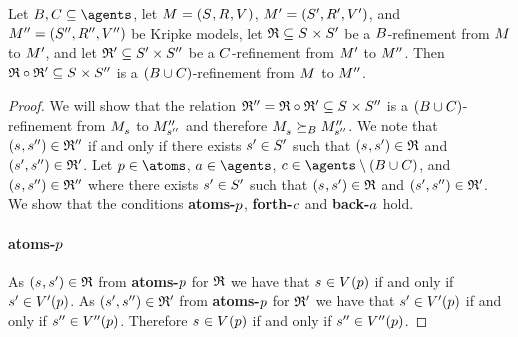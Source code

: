 \begin{proposition}\label{refinement-composition}
Let $\agentsB, \agentsC \subseteq \agents$, let $\kModelAndTuple$, $\kModelAndTupleP$, and $\kModelAndTuplePP$ be Kripke models, let $\refinement \subseteq \kStates \times \kStatesP$ be a $B$-refinement from $\kModel$ to ${M^{\prime}_{}}$, and let $\mathfrak{R}' \subseteq {S^{\prime}} \times {S^{\prime\prime}}$ be a $C$-refinement from ${M^{\prime}_{}}$ to ${M^{\prime\prime}_{}}$.
Then $\refinement \circ \refinement' \subseteq \kStates \times \kStatesPP$ is a $(B \cup C)$-refinement from $\kModel$ to ${M^{\prime\prime}_{}}$.
\end{proposition}

\begin{proof}
    We will show that the relation $\refinement'' = \refinement \circ \refinement' \subseteq \kStates \times \kStatesPP$ is a $(B \cup C)$-refinement from $\kPModel{\kStateS}$ to ${M^{\prime\prime}_{{s}^{\prime\prime}}}$ and therefore $\kPModel{\kStateS} \simulatesBs \kPModelPP{\kStateSPP}$.
We note that $(\kStateS, \kStateSPP) \in \refinement''$ if and only if there exists ${s}^{\prime} \in {S^{\prime}}$ such that $(\kStateS, \kStateSP) \in \refinement$ and $({s}^{\prime}, {s}^{\prime\prime}) \in \mathfrak{R}'$.
Let $\atomP \in \atoms$, $\agentA \in \agents$, $\agentC \in \agents \setminus (\agentsB \cup \agentsC)$, and $(\kStateS, \kStateSPP) \in \refinement''$ where there exists ${s}^{\prime} \in {S^{\prime}}$ such that $(\kStateS, \kStateSP) \in \refinement$ and $({s}^{\prime}, {s}^{\prime\prime}) \in \mathfrak{R}'$.
We show that the conditions {\bf atoms-$p$}, {\bf forth-$c$} and {\bf back-$a$} hold.

\paragraph{atoms-$p$}
As $(\kStateS, \kStateSP) \in \refinement$ from {\bf atoms-$p$} for $\mathfrak{R}$ we have that $\kStateS \in \kValuation(\atomP)$ if and only if ${s}^{\prime} \in {V^{\prime}}(p)$.
As $({s}^{\prime}, {s}^{\prime\prime}) \in \mathfrak{R}'$ from {\bf atoms-$p$} for $\mathfrak{R}'$ we have that ${s}^{\prime} \in {V^{\prime}}(p)$ if and only if ${s}^{\prime\prime} \in {V^{\prime\prime}}(p)$.
Therefore $\kStateS \in \kValuation(\atomP)$ if and only if ${s}^{\prime\prime} \in {V^{\prime\prime}}(p)$.


\end{proof}
